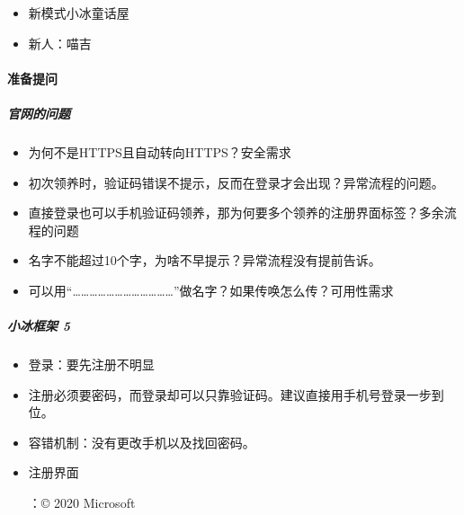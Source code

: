 \documentclass[letterpaper,11pt,english]{sphinxmanual}
\begin{document}
\begin{center}
{{\begin{itemize}
\item {} 
新模式小冰童话屋

\item {} 
新人：喵吉

\end{itemize}


\paragraph{准备提问}
\label{\detokenize{chapter_company/xiaoice:id18}}

\subparagraph{官网的问题}
\label{\detokenize{chapter_company/xiaoice:id19}}\begin{itemize}
\item {} 
为何不是HTTPS且自动转向HTTPS？安全需求

\item {} 
初次领养时，验证码错误不提示，反而在登录才会出现？异常流程的问题。

\item {} 
直接登录也可以手机验证码领养，那为何要多个领养的注册界面标签？多余流程的问题

\item {} 
名字不能超过10个字，为啥不早提示？异常流程没有提前告诉。

\item {} 
可以用“………………………………”做名字？如果传唤怎么传？可用性需求

\end{itemize}


\subparagraph{小冰框架 5\sphinxfootnotemark[943]}
\label{\detokenize{chapter_company/xiaoice:id20}}%
\begin{footnotetext}[943]\sphinxAtStartFootnote
{}
%
\end{footnotetext}\ignorespaces \begin{itemize}
\item {} 
登录：要先注册不明显

\item {} 
注册必须要密码，而登录却可以只靠验证码。建议直接用手机号登录一步到位。

\item {} 
容错机制：没有更改手机以及找回密码。

\item {} 
注册界面 %
\begin{footnote}[944]\sphinxAtStartFootnote
{}
%
\end{footnote}：© 2020 Microsoft


\end{itemize}}}
\end{center}
\end{document}
